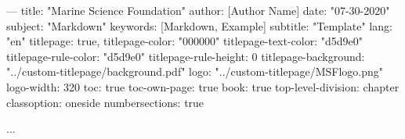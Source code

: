 ---
title: "Marine Science Foundation"
author: [Author Name]
date: "07-30-2020"
subject: "Markdown"
keywords: [Markdown, Example]
subtitle: "Template"
lang: "en"
titlepage: true,
titlepage-color: "000000"
titlepage-text-color: "d5d9e0"
titlepage-rule-color: "d5d9e0"
titlepage-rule-height: 0
titlepage-background: "../custom-titlepage/background.pdf"
logo: "../custom-titlepage/MSFlogo.png"
logo-width: 320
toc: true
toc-own-page: true
book: true
top-level-division: chapter
classoption: oneside
numbersections: true

...
